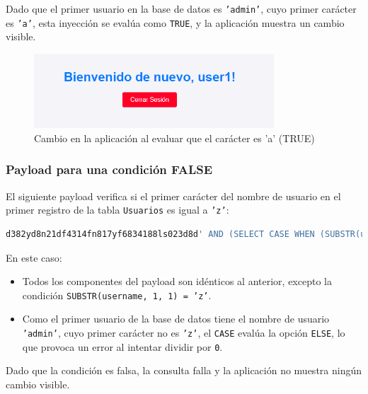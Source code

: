 \documentclass[a4paper,12pt]{article}
\begin{document}
Dado que el primer usuario en la base de datos es \texttt{'admin'}, cuyo primer carácter es \texttt{'a'}, esta inyección se evalúa como \texttt{TRUE}, y la aplicación muestra un cambio visible.

\begin{figure}[H]
    \centering
    \includegraphics[width=0.8\textwidth]{Imagenes/blind4.png}
    \caption{Cambio en la aplicación al evaluar que el carácter es 'a' (TRUE)}
\end{figure}

\subsubsection{Payload para una condición FALSE}

El siguiente payload verifica si el primer carácter del nombre de usuario en el primer registro de la tabla \texttt{Usuarios} es igual a \texttt{'z'}:

\begin{lstlisting}[language=SQL]
d382yd8n21df4314fn817yf6834188ls023d8d' AND (SELECT CASE WHEN (SUBSTR(username, 1, 1) = 'z') THEN 1 ELSE 1/0 END FROM (SELECT username, ROWNUM AS rn FROM Usuarios) WHERE rn=1) = 1 --
\end{lstlisting}

En este caso:
\begin{itemize}
    \item Todos los componentes del payload son idénticos al anterior, excepto la condición \texttt{SUBSTR(username, 1, 1) = 'z'}.
    \item Como el primer usuario de la base de datos tiene el nombre de usuario \texttt{'admin'}, cuyo primer carácter no es \texttt{'z'}, el \texttt{CASE} evalúa la opción \texttt{ELSE}, lo que provoca un error al intentar dividir por \texttt{0}.
\end{itemize}

Dado que la condición es falsa, la consulta falla y la aplicación no muestra ningún cambio visible.
\end{document}
